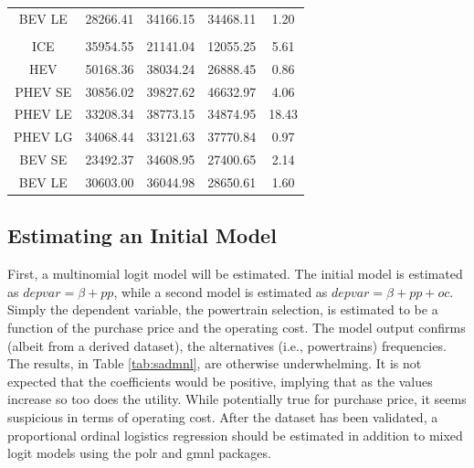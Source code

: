 \documentclass[]{elsarticle} %
\begin{document}
\begin{table}[t]
{\begin{tabular}{ccccc}
\hspace{1em}BEV LE & 28266.41 & 34166.15 & 34468.11 & 1.20\\
\addlinespace[0.3em]
\multicolumn{5}{l}{\textbf{\$14 000 Incentive}}\\
\hspace{1em}ICE & 35954.55 & 21141.04 & 12055.25 & 5.61\\
\hspace{1em}HEV & 50168.36 & 38034.24 & 26888.45 & 0.86\\
\hspace{1em}PHEV SE & 30856.02 & 39827.62 & 46632.97 & 4.06\\
\hspace{1em}PHEV LE & 33208.34 & 38773.15 & 34874.95 & 18.43\\
\hspace{1em}PHEV LG & 34068.44 & 33121.63 & 37770.84 & 0.97\\
\hspace{1em}BEV SE & 23492.37 & 34608.95 & 27400.65 & 2.14\\
\hspace{1em}BEV LE & 30603.00 & 36044.98 & 28650.61 & 1.60\\
\bottomrule
\end{tabular}}
\end{table}

\subsection{Estimating an Initial
Model}\label{estimating-an-initial-model}

First, a multinomial logit model will be estimated. The initial model is
estimated as \(depvar = \beta + pp\), while a second model is estimated
as \(depvar = \beta + pp + oc\). Simply the dependent variable, the
powertrain selection, is estimated to be a function of the purchase
price and the operating cost. The model output confirms (albeit from a
derived dataset), the alternatives (i.e., powertrains) frequencies. The
results, in Table \ref{tab:sadmnl}, are otherwise underwhelming. It is
not expected that the coefficients would be positive, implying that as
the values increase so too does the utility. While potentially true for
purchase price, it seems suspicious in terms of operating cost. After
the dataset has been validated, a proportional ordinal logistics
regression should be estimated in addition to mixed logit models using
the polr and gmnl packages.
\end{document}

